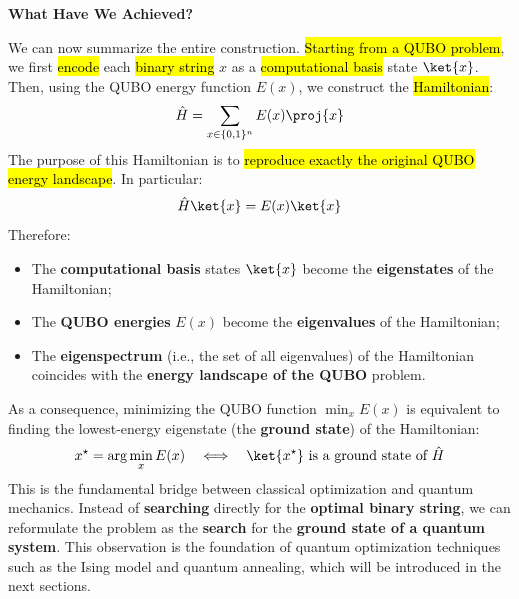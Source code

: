 \highspace
\begin{flushleft}
    \textcolor{Green3}{ \textbf{What Have We Achieved?}}
\end{flushleft}
We can now summarize the entire construction. \hl{Starting from a QUBO problem}, we first \hl{encode} each \hl{binary string} $x$ as a \hl{computational basis} state $\ket{x}$. Then, using the QUBO energy function $E(x)$, we construct the \hl{Hamiltonian}:
\begin{equation*}
    \hat{H}
    =
    \sum_{x \in \{0,1\}^{n}}
    E(x)\proj{x}
\end{equation*}
The purpose of this Hamiltonian is to \hl{reproduce exactly the original QUBO energy landscape}. In particular:
\begin{equation*}
    \hat{H}\ket{x}
    =
    E(x)\ket{x}
\end{equation*}
Therefore:
\begin{itemize}
    \item The \textbf{computational basis} states $\ket{x}$ become the \textbf{eigenstates} of the Hamiltonian;
    \item The \textbf{QUBO energies} $E(x)$ become the \textbf{eigenvalues} of the Hamiltonian;
    \item The \textbf{eigenspectrum} (i.e., the set of all eigenvalues) of the Hamiltonian coincides with the \textbf{energy landscape of the QUBO} problem.
\end{itemize}
As a consequence, minimizing the QUBO function $\min_x E(x)$ is equivalent to finding the lowest-energy eigenstate (the \textbf{ground state}) of the Hamiltonian:
\begin{equation*}
    x^\star = \arg\min_x E(x)
    \quad \Longleftrightarrow \quad
    \ket{x^\star}
    \text{ is a ground state of } \hat{H}
\end{equation*}
This is the fundamental bridge between classical optimization and quantum mechanics. \textcolor{Red2}{} Instead of \textbf{searching} directly for the \textbf{optimal binary string}, \textcolor{Green3}{} we can reformulate the problem as the \textbf{search} for the \textbf{ground state of a quantum system}. This observation is the foundation of quantum optimization techniques such as the Ising model and quantum annealing, which will be introduced in the next sections.